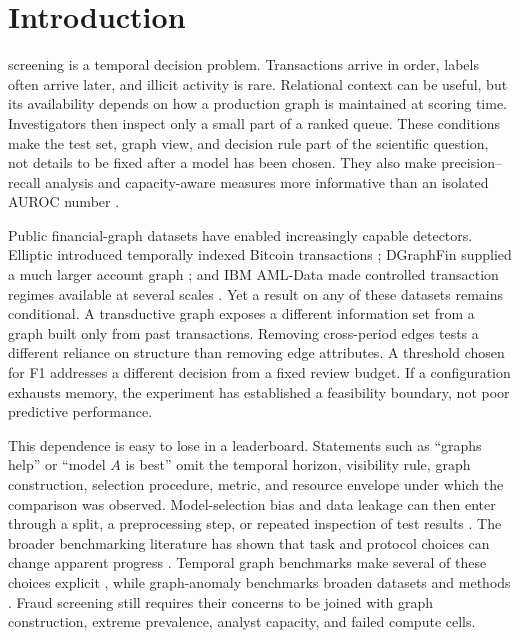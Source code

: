 \section{Introduction}
 screening is a temporal decision problem. Transactions arrive in order, labels often arrive later, and illicit activity is rare. Relational context can be useful, but its availability depends on how a production graph is maintained at scoring time. Investigators then inspect only a small part of a ranked queue. These conditions make the test set, graph view, and decision rule part of the scientific question, not details to be fixed after a model has been chosen. They also make precision--recall analysis and capacity-aware measures more informative than an isolated AUROC number \cite{saito2015pr,bahnsen2015cost,siddiqui2018feedback}.

Public financial-graph datasets have enabled increasingly capable detectors. Elliptic introduced temporally indexed Bitcoin transactions \cite{weber2019aml}; DGraphFin supplied a much larger account graph \cite{huang2022dgraph}; and IBM AML-Data made controlled transaction regimes available at several scales \cite{altman2023ibmaml}. Yet a result on any of these datasets remains conditional. A transductive graph exposes a different information set from a graph built only from past transactions. Removing cross-period edges tests a different reliance on structure than removing edge attributes. A threshold chosen for F1 addresses a different decision from a fixed review budget. If a configuration exhausts memory, the experiment has established a feasibility boundary, not poor predictive performance.

This dependence is easy to lose in a leaderboard. Statements such as ``graphs help'' or ``model $A$ is best'' omit the temporal horizon, visibility rule, graph construction, selection procedure, metric, and resource envelope under which the comparison was observed. Model-selection bias and data leakage can then enter through a split, a preprocessing step, or repeated inspection of test results \cite{cawley2010selection,kaufman2012leakage,kapoor2023leakage}. The broader benchmarking literature has shown that task and protocol choices can change apparent progress \cite{dehghani2021lottery,poursafaei2022better,reuel2024betterbench}. Temporal graph benchmarks make several of these choices explicit \cite{huang2023tgb,gastinger2024tgb2,huang2024benchtemp}, while graph-anomaly benchmarks broaden datasets and methods \cite{tang2023gadbench,hua2026bag}. Fraud screening still requires their concerns to be joined with graph construction, extreme prevalence, analyst capacity, and failed compute cells.

